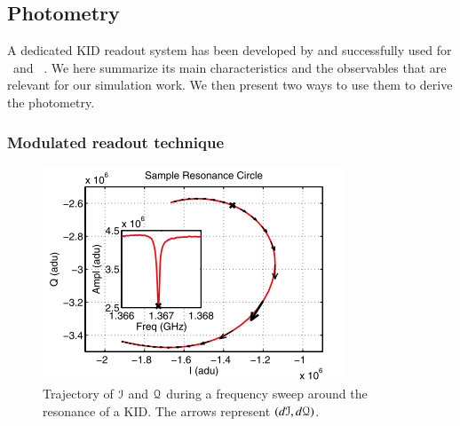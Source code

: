 \subsection{Photometry}
\label{sec:signal}

A dedicated KID readout system has been developed by \citet{2013A&A...551L..12C}
and successfully used for \nika\ and \ . We here summarize its main characteristics and the observables
that are relevant for our simulation work. We then present two ways to use them
to derive the photometry.


\subsubsection{Modulated readout technique}

\begin{figure}
  \includegraphics[clip,angle=0,width=\columnwidth]{../Figures/resonance-circle.png}
  \caption{Trajectory of $\mathcal{I}$ and $\mathcal{Q}$ during a frequency sweep around the
    resonance of a KID. The arrows represent $(d\mathcal{I},
    d\mathcal{Q})$. \citep{2013A&A...551L..12C}}
  \label{circle-iq}
\end{figure}


